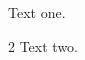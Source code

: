 \documentclass{article}
\begin{document}
Text one.

\begin{spacing}{2}
Text two.
\end{spacing}
\end{document}
